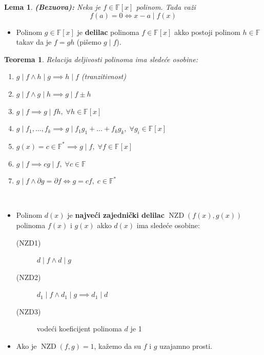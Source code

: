 \documentclass[a4paper,12pt,twoside]{report}
\newtheorem{theorem}{Teorema}[section]
\newtheorem{lemma}{Lema}[section]
\numberwithin{algorithm}{section}
\begin{document}
\begin{lemma}
    \textbf{(Bezuova):} Neka je $f \in \mathbb{F}[x]$ polinom. Tada važi
    \[ f(a) = 0 \iff x - a \;|\; f(x) \]
\end{lemma}

\begin{itemize}
    \item Polinom $g \in \mathbb{F}[x]$ je \textbf{delilac} polinoma $f \in \mathbb{F}[x]$ akko postoji polinom $h \in \mathbb{F}$ takav da je $f = gh$ (pišemo $g \; | \; f$).
\end{itemize}
\newpage
\begin{theorem}
    Relacija deljivosti polinoma ima sledeće osobine:
    \begin{enumerate}
        \item $g \; | \; f \land h \; | \; g \implies h \; | \; f$ (tranzitivnost)
        \item $g \; | \; f \land g \; | \; h \implies g \; | \; f \pm h$
        \item $g \; | \; f \implies g \; | \; fh, \; \forall h \in \mathbb{F}[x]$
        \item $g \; | \; f_1, \dots, f_k \implies g \; | \; f_1g_1 + \dots + f_kg_k, \; \forall g_i \in \mathbb{F}[x]$
        \item $g(x) = c \in \mathbb{F}^* \implies g \; | \; f, \; \forall f \in \mathbb{F}[x]$
        \item $g \; | \; f \implies cg \; | \; f, \; \forall c \in \mathbb{F}$
        \item $g \; | \; f \land \partial g = \partial f \iff g = cf, \; c \in \mathbb{F}^*$
    \end{enumerate}
\end{theorem}\

\begin{itemize}
    \item Polinom $d(x)$ je \textbf{najveći zajednički delilac} $\operatorname{NZD}(f(x), g(x))$ polinoma $f(x)$ i $g(x)$ akko $d(x)$ ima sledeće osobine:
    \begin{description}
        \item[(NZD1)] $d\;|\;f \land d\;|\;g$
        \item[(NZD2)] $d_1\;|\;f \land d_1\;|\;g \implies d_1\;|\;d$
        \item[(NZD3)] vodeći koeficijent polinoma $d$ je 1
    \end{description}
    \item Ako je $\operatorname{NZD}(f, g)=1$, kažemo da su $f$ i $g$ uzajamno prosti.
\end{itemize}
\end{document}
